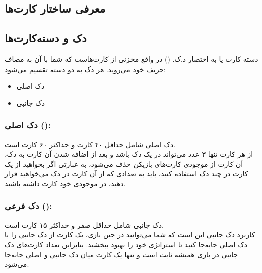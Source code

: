 \documentclass[]{article}
\begin{document}
\subsection*{{\titr معرفی ساختار کارت‌ها}}

\subsection*{{\titr دک و دسته‌کارت‌ها}}
دسته کارت یا به اختصار د.ک. () در واقع مخزنی از کارت‌هاست که شما با 
آن به مصاف حریف خود می‌روید. هر دک به دو دسته تقسیم می‌شود:
\begin{itemize}
	\item
	دک اصلی
	\item
	دک جانبی
\end{itemize}

\subsubsection*{{\titr دک اصلی ():}}
دک اصلی شامل حداقل ۴۰ کارت و حداکثر ۶۰ کارت است. 
\\
از هر کارت تنها ۳ عدد می‌تواند در یک دک باشد و بعد از اضافه شدن آن کارت به 
دک، آن کارت از موجودی کارت‌های بازیکن حذف می‌شود، به عبارتی اگر بخواهید از یک 
کارت در چند دک استفاده کنید، باید به تعدادی که از آن کارت در دک می‌خواهید 
قرار دهید، در موجودی خود کارت داشته باشید.

\subsubsection*{{\titr دک فرعی ():}}
دک جانبی شامل حداقل صفر و حداکثر ۱۵ کارت است.
\\
کاربرد دک جانبی این است که شما می‌توانید در حین بازی، یک کارت از دک جانبی را 
با دک اصلی جا‌به‌جا کنید تا استراتژی خود را بهبود ببخشید. بنابراین تعداد 
کارت‌های دک جانبی در بازی همیشه ثابت است و تنها یک کارت میان دک جانبی و اصلی 
جا‌به‌جا می‌شود.
\end{document}
